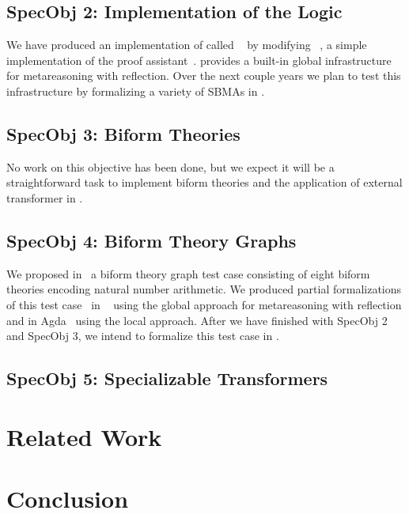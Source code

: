 \documentclass[fleqn]{llncs}
\begin{document}
\subsection*{SpecObj 2: Implementation of the Logic}

We have produced an implementation of {\churchqe} called
{\HLQE}~\cite{CaretteFarmerLaskowski18} by modifying
{\HL}~\cite{Harrison09}, a simple implementation of the {\HOL} proof
assistant~\cite{GordonMelham93}.  {\HLQE} provides a built-in global
infrastructure for metareasoning with reflection.  Over the next
couple years we plan to test this infrastructure by formalizing a
variety of SBMAs in {\HLQE}.

\subsection*{SpecObj 3: Biform Theories}

No work on this objective has been done, but we expect it will be a
straightforward task to implement biform theories and the application
of external transformer in {\HLQE}.

\subsection*{SpecObj 4: Biform Theory Graphs}

We proposed in~\cite{CaretteFarmer17} a biform theory graph test case
consisting of eight biform theories encoding natural number
arithmetic.  We produced partial formalizations of this test
case~\cite{CaretteFarmer17} in {\churchuqe}~\cite{Farmer17} using the
global approach for metareasoning with reflection and in
Agda~\cite{Norell07,Norell09} using the local approach.  After we have
finished with SpecObj 2 and SpecObj 3, we intend to formalize this
test case in {\HLQE}.

\subsection*{SpecObj 5: Specializable Transformers}




\section{Related Work}


\section{Conclusion}




\setcounter{tocdepth}{1}
\listoftodos
\setcounter{tocdepth}{0}
\end{document}
